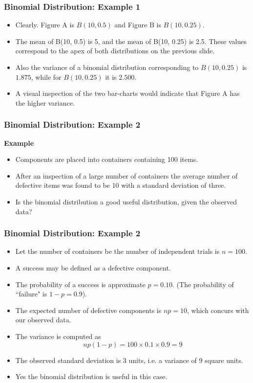 \documentclass[a4]{beamer}
\begin{document}
\begin{frame}
\frametitle{Binomial Distribution: Example 1}
\begin{itemize}
\item Clearly. Figure A is $B(10, 0.5)$ and Figure B is $B(10, 0.25)$.
\item The mean of B(10, 0.5) is 5, and the mean of B(10, 0.25) is 2.5. These values correspond to the apex of both distributions on the previous slide.
\item Also the variance of a binomial distribution corresponding to $B(10, 0.25)$ is $1.875$, while for $B(10, 0.25)$ it is $2.500$.
\item A visual inspection of the two bar-charts would indicate that Figure A has the higher variance.
\end{itemize}
\end{frame}
\begin{frame}
\frametitle{Binomial Distribution: Example 2}
\textbf{Example}
\begin{itemize}
\item Components are placed into containers containing 100 items.
\item After an inspection of a large number of containers the average number of defective items was found to be 10 with a standard deviation of three.
\item Is the binomial distribution a good useful distribution, given the observed data?
\end{itemize}
\end{frame}
\begin{frame}
\frametitle{Binomial Distribution: Example 2}

\begin{itemize}
\item Let the number of containers be the number of independent trials is $n=100$.
\item A success may be defined as a defective component.
\item The probability of a success is approximate $p=0.10$. (The probability of ``failure" is $1-p=0.9$).
\item The expected number of defective components is $np=10$, which concurs with our observed data.
\item The variance is computed as \[np(1-p) = 100 \times 0.1 \times 0.9 = 9\]
\item The observed standard deviation is 3 units, i.e. a variance of 9 square units.
\item Yes the binomial distribution is useful in this case.
\end{itemize}
\end{frame}
\end{document}
